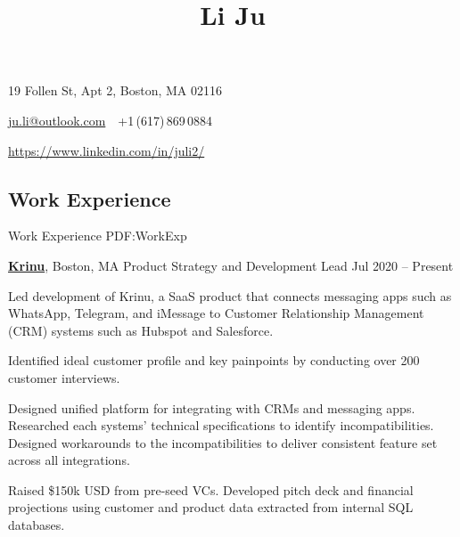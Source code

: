 \documentclass[letterpaper,10pt,oneside]{article}
\newcommand{\CVAuthor}{Li Ju}
\begin{document}

\title{\CVAuthor}

\begin{subtitle}
\vspace{0.7em}
19 Follen St, Apt 2, Boston, MA 02116
\par
\href{mailto:ju.li@outlook.com}
{ju.li@outlook.com}
\,\SubBulletSymbol\,
+1\,(617)\,869\,0884
\par 
\href{https://www.linkedin.com/in/juli2/}{https://www.linkedin.com/in/juli2/}
\end{subtitle}

\begin{body}


\section
{Work\newline
Experience}
{Work Experience}
{PDF:WorkExp}

\href{https://krinu.com/}
{\textbf{Krinu}},
Boston, MA
\GapNoBreak
Product Strategy and Development Lead
\hfill
Jul 2020 -- Present
\begin{flushleft}

\BulletItem Led development of Krinu, a SaaS product that connects messaging apps such as WhatsApp, Telegram, and iMessage to Customer Relationship Management (CRM) systems such as Hubspot and Salesforce. 

\vspace{0.3em} \SubBulletItem 
Identified ideal customer profile and key painpoints by conducting over 200 customer interviews.  

\vspace{0.3em} \SubBulletItem Designed unified platform for integrating with CRMs and messaging apps. Researched each systems' technical specifications to identify incompatibilities. Designed workarounds to the incompatibilities to deliver consistent feature set across all integrations. 

\vspace{0.75em}
\BulletItem Raised \$150k USD from pre-seed VCs. Developed pitch deck and financial projections using customer and product data extracted from internal SQL databases. 

\end{flushleft}



\end{body}
\end{document}
